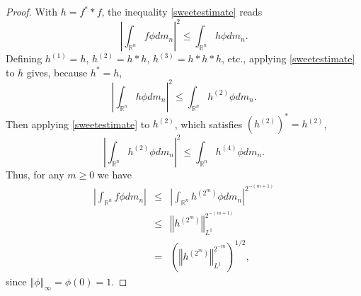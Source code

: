 \documentclass{article}
\newcommand{\norm}[1]{\left\Vert #1 \right\Vert}
\theoremstyle{definition}
\theoremstyle{definition}
\begin{document}
\begin{proof}
With $h=f^* * f$, the inequality \eqref{sweetestimate} reads
\[
\left| \int_{\mathbb{R}^n} f\phi dm_n \right|^2 \leq \int_{\mathbb{R}^n} h\phi dm_n.
\]
Defining $h^{(1)}=h$, $h^{(2)}=h*h$, $h^{(3)}=h*h*h$, etc.,  applying \eqref{sweetestimate} to $h$ gives, because $h^*=h$,
\[
\left| \int_{\mathbb{R}^n} h \phi dm_n \right|^2 \leq \int_{\mathbb{R}^n} h^{(2)} \phi dm_n.
\]
Then applying \eqref{sweetestimate} to $h^{(2)}$, which satisfies $(h^{(2)})^*=h^{(2)}$,
\[
\left| \int_{\mathbb{R}^n} h^{(2)} \phi dm_n \right|^2 \leq \int_{\mathbb{R}^n} h^{(4)} \phi dm_n.
\]
Thus, for any $m \geq 0$ we have 
\begin{eqnarray*}
\left| \int_{\mathbb{R}^n} f \phi dm_n \right| &\leq& \left| \int_{\mathbb{R}^n} h^{\left(2^m\right)} \phi dm_n \right|^{2^{-(m+1)}}\\
&\leq&\norm{h^{\left(2^m\right)}}_{L^1}^{2^{-(m+1)}}\\
&=&\left(\norm{h^{\left(2^m\right)}}_{L^1}^{2^{-m}}\right)^{1/2},
\end{eqnarray*}
since $\norm{\phi}_\infty = \phi(0) =1$. 


\end{proof}
\end{document}
